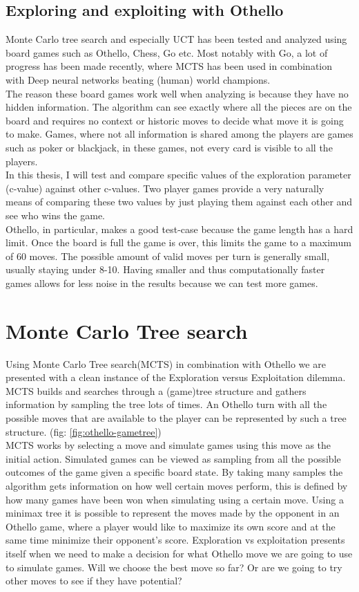 \documentclass[
11pt, %
english, %
singlespacing, %
headsepline, %
]{MastersDoctoralThesis} %
\begin{document}
\subsection{Exploring and exploiting with Othello}
Monte Carlo tree search and especially UCT has been tested and analyzed using board games such as Othello, Chess, Go etc. Most notably with Go, a lot of progress has been made recently, where MCTS has been used in combination with Deep neural networks beating (human) world champions\cite{deepmind}.\\
The reason these board games work well when analyzing is because they have no hidden information. The algorithm can see exactly where all the pieces are on the board and requires no context or historic moves to decide what move it is going to make. Games, where not all information is shared among the players are games such as poker or blackjack, in these games, not every card is visible to all the players.\\

In this thesis, I will test and compare specific values of the exploration parameter (c-value) against other c-values. Two player games provide a very naturally means of comparing these two values by just playing them against each other and see who wins the game.\\
Othello, in particular, makes a good test-case because the game length has a hard limit. Once the board is full the game is over, this limits the game to a maximum of 60 moves. The possible amount of valid moves per turn is generally small, usually staying under 8-10. Having smaller and thus computationally faster games allows for less noise in the results because we can test more games.

\section{Monte Carlo Tree search}
Using Monte Carlo Tree search(MCTS) in combination with Othello we are presented with a clean instance of the Exploration versus Exploitation dilemma. MCTS builds and searches through a (game)tree structure and gathers information by sampling the tree lots of times. An Othello turn with all the possible moves that are available to the player can be represented by such a tree structure. (fig: \ref{fig:othello-gametree})\\ 

MCTS works by selecting a move and simulate games using this move as the initial action. Simulated games can be viewed as sampling from all the possible outcomes of the game given a specific board state. By taking many samples the algorithm gets information on how well certain moves perform, this is defined by how many games have been won when simulating using a certain move. Using a minimax tree it is possible to represent the moves made by the opponent in an Othello game, where a player would like to maximize its own score and at the same time minimize their opponent's score. 
Exploration vs exploitation presents itself when we need to make a decision for what Othello move we are going to use to simulate games. Will we choose the best move so far? Or are we going to try other moves to see if they have potential?
\end{document}
